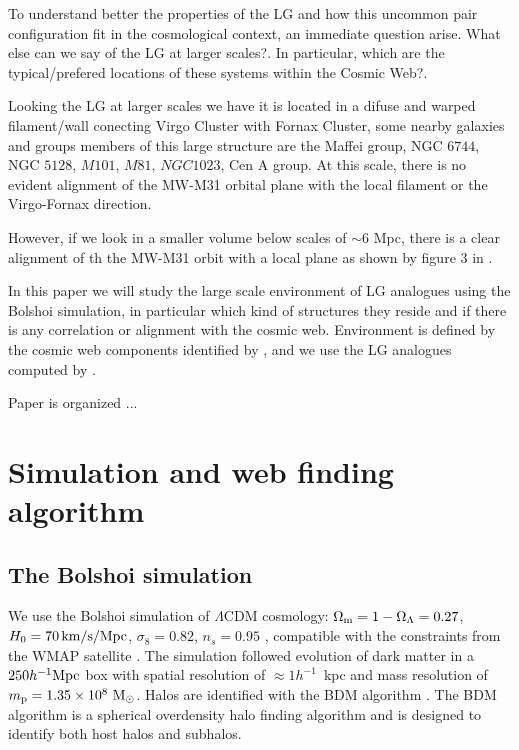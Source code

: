 \documentclass{emulateapj}
\newcommand{\mpc}{\rm{Mpc}}
\newcommand{\hmpc}{{\ifmmode{h^{-1}{\rm Mpc}}\else{$h^{-1}$Mpc }\fi}}
\begin{document}
To understand better the properties of the LG and how this uncommon
pair configuration fit in the cosmological context, an immediate
question arise. What else can we say of the LG at larger scales?. In
particular, which are the typical/prefered locations of these systems
within the Cosmic Web?.

Looking the LG at larger scales we have it is located in a difuse and
warped filament/wall conecting Virgo Cluster with Fornax Cluster, some
nearby galaxies and groups members of this large structure are the
Maffei group, NGC $6744$, NGC $5128$, $M101$, $M81$, $NGC1023$, Cen A
group. At this scale, there is no evident alignment of the MW-M31
orbital plane with the local filament or the Virgo-Fornax direction.  

However, if we look in a smaller volume below scales of $\sim 6$ \mpc,
there is a clear alignment of th the MW-M31 orbit with a local plane
as shown by figure $3$ in \citet{2013AJ....146...69C}. 

In this paper we will study the large scale environment of LG
analogues using the Bolshoi simulation, in particular which kind of
structures they reside and if there is any correlation or alignment
with the cosmic web.  
Environment is defined by the cosmic web components identified by
\citet{Tweb}, and we use the LG analogues computed by
\citet{lganalogues}. 

Paper is organized ...


\section{Simulation and web finding algorithm}
\label{sec:Simulation}

\subsection{The Bolshoi simulation}
We use the Bolshoi simulation of $\Lambda$CDM cosmology: $\Omega_{\rm
  m}=1-\Omega_{\Lambda}=0.27$, $H_0=70\,\rm km/s/Mpc$,
$\sigma_8=0.82$, $n_s=0.95$ \citep{2011ApJ...740..102K}, compatible
with the constraints from the WMAP satellite
\citep{hinshaw_etal13}. The simulation followed evolution of dark
matter in a $250 \hmpc$ box with spatial resolution of $\approx
1h^{-1}$~kpc and mass resolution of $m_{\rm p}=1.35\times 10^8\ \rm
M_{\odot}$. Halos are identified with the BDM algorithm
\citep{1997astro.ph.12217K}. The BDM algorithm is  a spherical
overdensity halo finding algorithm and is designed to identify both
host halos and subhalos. 
\end{document}
